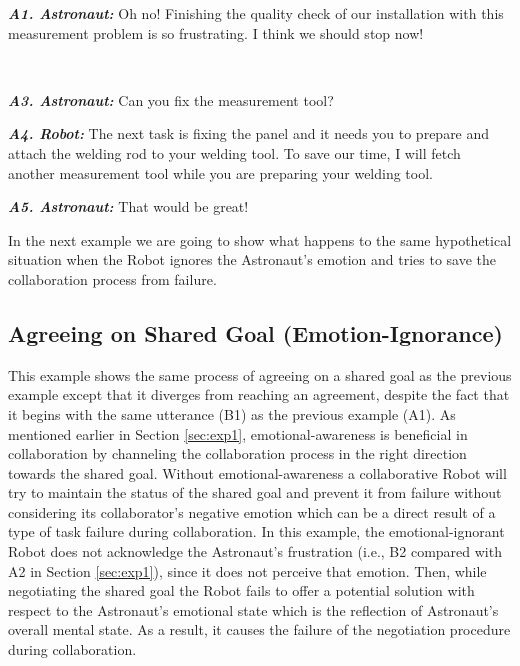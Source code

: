 \begin{description}
  \item \textit{\textbf{A1. Astronaut:}} Oh no! Finishing the quality check of
  our installation with this measurement problem is so frustrating. I think we
  should stop now!\\

  \item {}\\
  
  \item \textit{\textbf{A3. Astronaut:}} Can you fix the measurement tool?\\

  \item \textit{\textbf{A4. Robot:}} The next task is fixing the panel and it
  needs you to prepare and attach the welding rod to your welding tool. To save
  our time, I will fetch another measurement tool while you are preparing your
  welding tool.\\

  \item \textit{\textbf{A5. Astronaut:}} That would be great!
  
\end{description}

In the next example we are going to show what happens to the same hypothetical
situation when the Robot ignores the Astronaut's emotion and tries to save the
collaboration process from failure.

\subsection{Agreeing on Shared Goal (Emotion-Ignorance)}
\label{sec:exp2}

This example shows the same process of agreeing on a shared goal as the previous
example except that it diverges from reaching an agreement, despite the fact
that it begins with the same utterance (B1) as the previous example (A1). As
mentioned earlier in Section \ref{sec:exp1}, emotional-awareness is beneficial
in collaboration by channeling the collaboration process in the right direction
towards the shared goal. Without emotional-awareness a collaborative Robot will
try to maintain the status of the shared goal and prevent it from failure
without considering its collaborator's negative emotion which can be a direct
result of a type of task failure during collaboration. In this example, the
emotional-ignorant Robot does not acknowledge the Astronaut's frustration (i.e.,
B2 compared with A2 in Section \ref{sec:exp1}), since it does not perceive that
emotion. Then, while negotiating the shared goal the Robot fails to offer a
potential solution with respect to the Astronaut's emotional state which is the
reflection of Astronaut's overall mental state. As a result, it causes the
failure of the negotiation procedure during collaboration.

